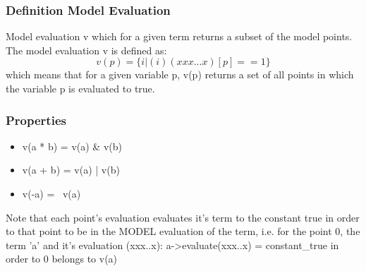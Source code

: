 \documentclass{article}
\begin{document}
				\subsubsection*{Definition Model Evaluation}
				Model evaluation v which for a given term returns a subset of the model points.
				The model evaluation v is defined as:
				\begin{equation*}
					v(p) = \{ i | (i) (xxx...x)[p] == 1 \} 
				\end{equation*}
				which means that for a given variable p, 
				v(p) returns a set of all points in which the variable p is evaluated to true.

				\subsubsection*{Properties}
				\begin{itemize}
					\item v(a * b) = v(a) \& v(b)
					\item v(a + b) = v(a) | v(b)
					\item v(-a) = ~v(a)
				\end{itemize}

				Note that each point's evaluation evaluates it's term to the constant true in order to that point to be
				in the MODEL evaluation of the term, i.e. for the point 0, 
				the term 'a' and it's evaluation (xxx..x): a->evaluate(xxx..x) = constant\_true 
				in order to 0 belongs to v(a)
				\newline
			
\end{document}
